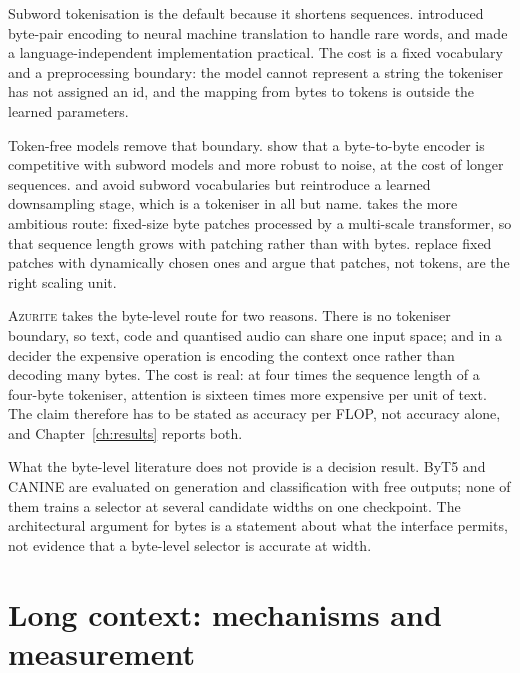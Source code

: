 Subword tokenisation is the default because it shortens sequences.
\citet{sennrich2016bpe} introduced byte-pair encoding to neural machine translation to handle rare words,
and \citet{kudo2018sentencepiece} made a language-independent implementation
practical. The cost is a fixed vocabulary and a preprocessing boundary: the model
cannot represent a string the tokeniser has not assigned an id, and the mapping
from bytes to tokens is outside the learned parameters.

Token-free models remove that boundary. \citet{xue2022byt5} show that a
byte-to-byte encoder is competitive with subword models and more robust to noise,
at the cost of longer sequences. \citet{clark2022canine} and
\citet{tay2021charformer} avoid subword vocabularies but reintroduce a learned
downsampling stage, which is a tokeniser in all but name. \citet{yu2023megabyte}
takes the more ambitious route: fixed-size byte patches processed by a
multi-scale transformer, so that sequence length grows with patching rather than
with bytes. \citet{pagnoni2024blt} replace fixed patches with dynamically chosen
ones and argue that patches, not tokens, are the right scaling unit.

\textsc{Azurite} takes the byte-level route for two reasons. There is no tokeniser
boundary, so text, code and quantised audio can share one input space; and in a
decider the expensive operation is encoding the context once rather than decoding
many bytes. The cost is real: at four times the sequence length of a four-byte
tokeniser, attention is sixteen times more expensive per unit of text. The claim
therefore has to be stated as accuracy per FLOP, not accuracy alone, and
Chapter~\ref{ch:results} reports both.

What the byte-level literature does not provide is a decision result. ByT5 and
CANINE are evaluated on generation and classification with free outputs; none of
them trains a selector at several candidate widths on one checkpoint. The
architectural argument for bytes is a statement about what the interface permits,
not evidence that a byte-level selector is accurate at width.

\section{Long context: mechanisms and measurement}


